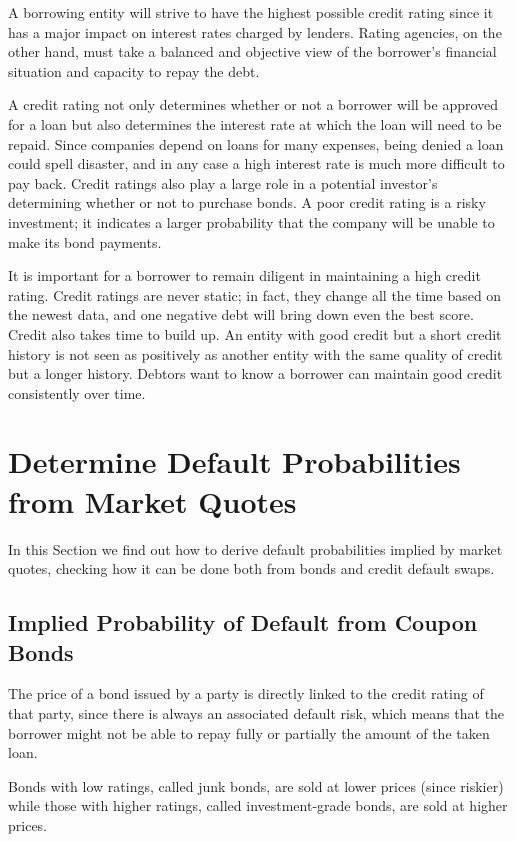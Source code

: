 A borrowing entity will strive to have the highest possible credit rating since it has a major impact on interest rates charged by lenders. Rating agencies, on the other hand, must take a balanced and objective view of the borrower's financial situation and capacity to repay the debt.

A credit rating not only determines whether or not a borrower will be approved for a loan but also determines the interest rate at which the loan will need to be repaid. Since companies depend on loans for many expenses, being denied a loan could spell disaster, and in any case a high interest rate is much more difficult to pay back.
Credit ratings also play a large role in a potential investor's determining whether or not to purchase bonds. A poor credit rating is a risky investment; it indicates a larger probability that the company will be unable to make its bond payments.

It is important for a borrower to remain diligent in maintaining a high credit rating. Credit ratings are never static; in fact, they change all the time based on the newest data, and one negative debt will bring down even the best score. 
Credit also takes time to build up. An entity with good credit but a short credit history is not seen as positively as another entity with the same quality of credit but a longer history. Debtors want to know a borrower can maintain good credit consistently over time.

\section{Determine Default Probabilities from Market Quotes}
In this Section we find out how to derive default probabilities implied by market quotes, checking how it can be done both from bonds and credit default swaps.

\subsection{Implied Probability of Default from Coupon Bonds}\label{default-probabilities-and-bond-prices}

The price of a bond issued by a party is directly linked to the credit rating of that party, since there is always an associated default risk, which means that the borrower might not be able to repay fully or partially the amount of the taken loan. 

Bonds with low ratings, called junk bonds, are sold at lower prices (since riskier) while those with higher ratings, called investment-grade bonds, are sold at higher prices.

